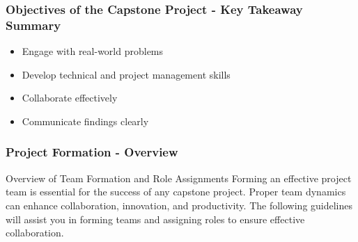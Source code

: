 \documentclass[aspectratio=169]{beamer}
\begin{document}
\begin{frame}[fragile]
    \frametitle{Objectives of the Capstone Project - Key Takeaway Summary}
    \begin{itemize}
        \item Engage with real-world problems
        \item Develop technical and project management skills
        \item Collaborate effectively
        \item Communicate findings clearly
    \end{itemize}
\end{frame}

\begin{frame}[fragile]
    \frametitle{Project Formation - Overview}
    \begin{block}{Overview of Team Formation and Role Assignments}
        Forming an effective project team is essential for the success of any capstone project. Proper team dynamics can enhance collaboration, innovation, and productivity. The following guidelines will assist you in forming teams and assigning roles to ensure effective collaboration.
    \end{block}
\end{frame}
\end{document}
